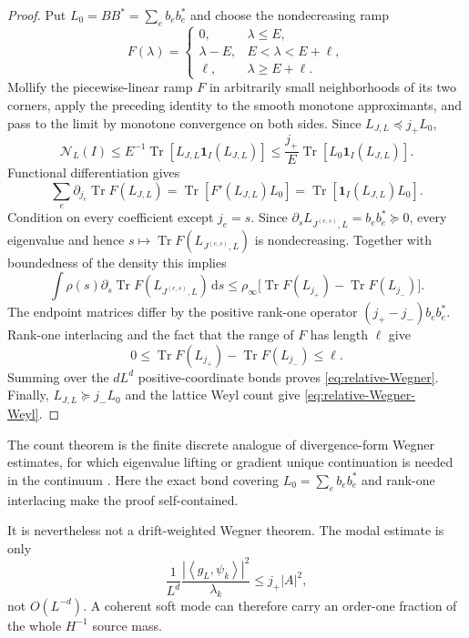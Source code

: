 \documentclass[11pt]{article}
\theoremstyle{definition}
\theoremstyle{remark}
\newcommand{\ip}[2]{\left\langle #1,#2\right\rangle}
\newcommand{\abs}[1]{\left\lvert #1\right\rvert}
\newcommand{\dd}{\,\mathrm d}
\begin{document}
\begin{proof}
Put $L_0=BB^*=\sum_eb_eb_e^*$ and choose the nondecreasing ramp
\[
 F(\lambda)=
 \begin{cases}
 0,&\lambda\le E,\\
 \lambda-E,&E<\lambda<E+\ell,\\
 \ell,&\lambda\ge E+\ell.
 \end{cases}
\]
Mollify the piecewise-linear ramp $F$ in arbitrarily small neighborhoods of its two corners, apply the preceding identity to the smooth monotone approximants, and pass to the limit by monotone convergence on both sides.  Since
$L_{J,L}\preceq j_+L_0$,
\[
 \mathcal N_L(I)
 \le E^{-1}\operatorname{Tr}[L_{J,L}\bm{1}_I(L_{J,L})]
 \le \frac{j_+}{E}\operatorname{Tr}[L_0\bm{1}_I(L_{J,L})].
\]
Functional differentiation gives
\[
 \sum_e\partial_{j_e}\operatorname{Tr} F(L_{J,L})
 =\operatorname{Tr}[F'(L_{J,L})L_0]
 =\operatorname{Tr}[\bm{1}_I(L_{J,L})L_0].
\]
Condition on every coefficient except $j_e=s$.  Since
$\partial_sL_{J^{(e,s)},L}=b_eb_e^*\succeq0$, every eigenvalue and hence
$s\mapsto\operatorname{Tr}F(L_{J^{(e,s)},L})$ is nondecreasing.  Together
with boundedness of the density this implies
\[
 \int\rho(s)\partial_s\operatorname{Tr} F(L_{J^{(e,s)},L})\dd s
 \le\rho_\infty
 \bigl[\operatorname{Tr} F(L_{j_+})-\operatorname{Tr} F(L_{j_-})\bigr].
\]
The endpoint matrices differ by the positive rank-one operator
$(j_+-j_-)b_eb_e^*$.  Rank-one interlacing and the fact that the range of $F$
has length $\ell$ give
\[
 0\le\operatorname{Tr} F(L_{j_+})-\operatorname{Tr} F(L_{j_-})\le\ell.
\]
Summing over the $dL^d$ positive-coordinate bonds proves
\eqref{eq:relative-Wegner}.  Finally,
$L_{J,L}\succeq j_-L_0$ and the lattice Weyl count give
\eqref{eq:relative-Wegner-Weyl}.
\end{proof}

The count theorem is the finite discrete analogue of divergence-form Wegner
estimates, for which eigenvalue lifting or gradient unique continuation is
needed in the continuum \cite{Dicke2021,DickeVeselic2023}.  Here the exact
bond covering $L_0=\sum_eb_eb_e^*$ and rank-one interlacing make the proof
self-contained.

It is nevertheless not a drift-weighted Wegner theorem.  The modal estimate is
only
\begin{equation}
 \frac1{L^d}\frac{\abs{\ip{g_L}{\psi_k}}^2}{\lambda_k}
 \le j_+\abs A^2,
 \label{eq:single-mode-coherent-bound}
\end{equation}
not $O(L^{-d})$.  A coherent soft mode can therefore carry an order-one
fraction of the whole $H^{-1}$ source mass.
\end{document}
